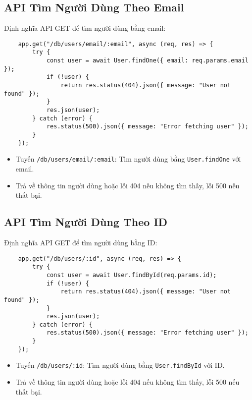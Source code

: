         \subsection{API Tìm Người Dùng Theo Email}
            \hspace*{0.6cm}Định nghĩa API GET để tìm người dùng bằng email:
            \begin{lstlisting}
    app.get("/db/users/email/:email", async (req, res) => {
        try {
            const user = await User.findOne({ email: req.params.email });
            if (!user) {
                return res.status(404).json({ message: "User not found" });
            }
            res.json(user);
        } catch (error) {
            res.status(500).json({ message: "Error fetching user" });
        }
    });
            \end{lstlisting}
            \begin{itemize}
                \item Tuyến \texttt{/db/users/email/:email}: Tìm người dùng bằng \texttt{User.findOne} với email.
                \item Trả về thông tin người dùng hoặc lỗi 404 nếu không tìm thấy, lỗi 500 nếu thất bại.
            \end{itemize}

        \subsection{API Tìm Người Dùng Theo ID}
            \hspace*{0.6cm}Định nghĩa API GET để tìm người dùng bằng ID:
            \begin{lstlisting}
    app.get("/db/users/:id", async (req, res) => {
        try {
            const user = await User.findById(req.params.id);
            if (!user) {
                return res.status(404).json({ message: "User not found" });
            }
            res.json(user);
        } catch (error) {
            res.status(500).json({ message: "Error fetching user" });
        }
    });
            \end{lstlisting}
            \begin{itemize}
                \item Tuyến \texttt{/db/users/:id}: Tìm người dùng bằng \texttt{User.findById} với ID.
                \item Trả về thông tin người dùng hoặc lỗi 404 nếu không tìm thấy, lỗi 500 nếu thất bại.
            \end{itemize}

